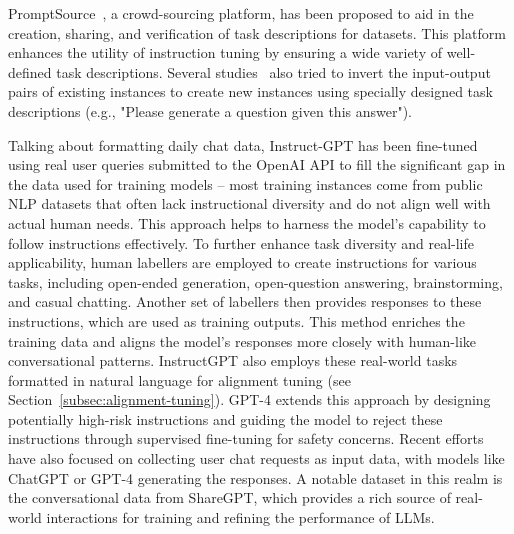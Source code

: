 PromptSource~\cite{bach2022promptsource}, a crowd-sourcing platform, has been proposed to aid in the creation, sharing, and verification of task descriptions for datasets.
This platform enhances the utility of instruction tuning by ensuring a wide variety of well-defined task descriptions.
Several studies~\cite{sanhetal2022multitask, tang2022mvp, longpre2023flan} also tried to invert the input-output pairs of existing instances to create new instances using specially designed task descriptions (e.g., "Please generate a question given this answer").

Talking about formatting daily chat data, Instruct-GPT has been fine-tuned using real user queries submitted to the OpenAI API to fill the significant gap in the data used for training models -- most training instances come from public NLP datasets that often lack instructional diversity and do not align well with actual human needs.
This approach helps to harness the model's capability to follow instructions effectively.
To further enhance task diversity and real-life applicability, human labellers are employed to create instructions for various tasks, including open-ended generation, open-question answering, brainstorming, and casual chatting.
Another set of labellers then provides responses to these instructions, which are used as training outputs.
This method enriches the training data and aligns the model's responses more closely with human-like conversational patterns.
InstructGPT also employs these real-world tasks formatted in natural language for alignment tuning (see Section~\ref{subsec:alignment-tuning}).
GPT-4 extends this approach by designing potentially high-risk instructions and guiding the model to reject these instructions through supervised fine-tuning for safety concerns.
Recent efforts have also focused on collecting user chat requests as input data, with models like ChatGPT or GPT-4 generating the responses.
A notable dataset in this realm is the conversational data from ShareGPT, which provides a rich source of real-world interactions for training and refining the performance of LLMs.

